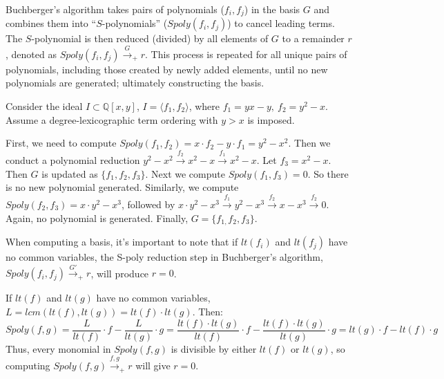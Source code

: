 Buchberger's algorithm takes pairs of polynomials ($f_{i}, f_{j}$) in 
the basis $G$ and combines them into ``$S$-polynomials'' 
($Spoly(f_{i}, f_{j})$) to cancel leading terms. The $S$-polynomial is then 
reduced (divided) by all elements of $G$ to a remainder $r$, denoted as  
$Spoly(f_{i}, f_{j}) \stackrel{G}{\textstyle\longrightarrow}_+r$. This
process is repeated for all unique pairs of polynomials, including
those created by newly added elements, until no new polynomials are
generated; ultimately constructing the \Grobner basis.
\begin{Example}\label{exp:gbsimple}
Consider the ideal $I \subset \mathbb{Q}[x, y]$, $I = \langle f_1, f_2 
\rangle$, where $f_1 = yx - y, ~f_2 = y^2 - x$. 
Assume a degree-lexicographic term ordering with $y > x$ is imposed. 

First, we need to compute $Spoly(f_{1},f_{2})=x\cdot f_{2}-y\cdot f_{1}=y^{2}-x^{2}$.
Then we conduct a polynomial reduction 
$y^{2}-x^{2}\stackrel{f_{2}}{\textstyle\longrightarrow}x^{2}-x \stackrel{f_{1}}{\textstyle\longrightarrow}x^{2}-x$.
Let $f_{3}=x^{2}-x$. Then $G$ is updated as $\{f_{1},f_{2},f_{3}\}$. Next we compute $Spoly(f_{1},f_{3})=0$. So there
is no new polynomial generated. Similarly, we compute $Spoly(f_{2},f_{3})=x\cdot y^{2}-x^{3}$, followed by 
$x\cdot y^{2}-x^{3}\stackrel{f_{1}}{\textstyle\longrightarrow}y^{2}-x^{3} \stackrel{f_{2}}{\textstyle\longrightarrow}x-x^{3}
\stackrel{f_{2}}{\textstyle\longrightarrow}0$. Again, no polynomial is generated. Finally, $G=\{f_{1,}f_{2},f_{3}\}$.

\end{Example}

When computing a \Grobner basis, it's important to note that if $lt(f_i)$ 
and $lt(f_j)$ have no common variables, the S-poly reduction step in 
Buchberger's algorithm,
$Spoly(f_{i}, f_{j}) \stackrel{G'}{\textstyle\longrightarrow}_+r$,
will produce $r=0$.

\begin{Proof}
If $lt(f)$ and $lt(g)$ have no common variables,  
$L=lcm(lt(f),lt(g))=lt(f)\cdot lt(g)$. Then: 
\begin{equation}
    Spoly(f,g)=\frac{L}{lt(f)}\cdot f - \frac{L}{lt(g)}\cdot g=
\frac{lt(f)\cdot lt(g)}{lt(f)}\cdot f - \frac{lt(f)\cdot lt(g)}{lt(g)}\cdot g
= lt(g)\cdot f - lt(f)\cdot g \nonumber
\end{equation}
Thus, every monomial in $Spoly(f, g)$ is divisible by either $lt(f)$ 
or $lt(g)$, so computing 
$Spoly(f, g) \stackrel{f,g}{\textstyle\longrightarrow}_+r$ will give $r=0$.
\end{Proof}

